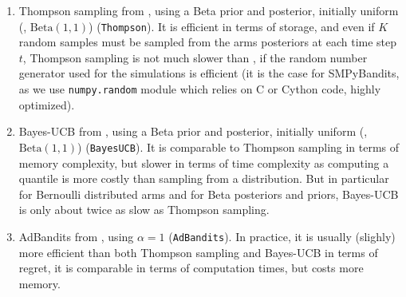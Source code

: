 \begin{enumerate}
    \item
    Thompson sampling from \cite{Kaufmann12Thompson}, using a Beta prior and posterior, initially uniform (\ie, $\mathrm{Beta}(1,1)$) (\texttt{Thompson}).
    It is efficient in terms of storage, and even if $K$ random samples must be sampled from the arms posteriors at each time step $t$, Thompson sampling is not much slower than \UCB, if the random number generator used for the simulations is efficient (it is the case for SMPyBandits, as we use \texttt{numpy.random} module which relies on C or Cython code, highly optimized).

    \item
    Bayes-UCB from \cite{Kaufmann12BUCB}, using a Beta prior and posterior, initially uniform (\ie, $\mathrm{Beta}(1,1)$) (\texttt{BayesUCB}).
    It is comparable to Thompson sampling in terms of memory complexity, but slower in terms of time complexity as computing a quantile is more costly than sampling from a distribution.
    But in particular for Bernoulli distributed arms and for Beta posteriors and priors, Bayes-UCB is only about twice as slow as Thompson sampling.

    \item
    AdBandits from \cite{Truzzi13}, using $\alpha=1$ (\texttt{AdBandits}).
    In practice, it is usually (slighly) more efficient than both Thompson sampling and Bayes-UCB in terms of regret, it is comparable in terms of computation times, but costs more memory.


\end{enumerate}
